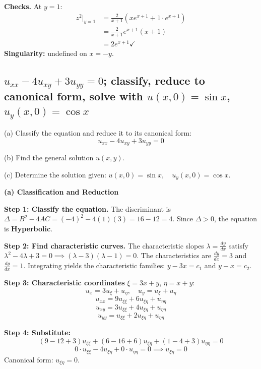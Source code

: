 \documentclass[a4paper,11pt]{article} %
\begin{document}
\textbf{Checks.} At $y=1$:
\begin{align*}
    z^2 \big|_{y=1} &= \frac{2}{x+1} \left( x e^{x+1} + 1 \cdot e^{x + 1} \right) \\
    &= \frac{2}{x+1} e^{x+1} (x+1) \\
    &= 2e^{x+1} \checkmark
\end{align*}
\textbf{Singularity:} undefined on $x=-y$.
\newpage
\subsection{\texorpdfstring{$u_{xx} - 4u_{xy} + 3u_{yy} = 0$; classify, reduce to canonical form, solve with $u(x,0)=\sin x$, $u_y(x,0)=\cos x$}{Classify hyperbolic PDE, find characteristic coords, solve Cauchy problem}}

\begin{problembox}
(a) Classify the equation and reduce it to its canonical form:
$$u_{xx} - 4u_{xy} + 3u_{yy} = 0$$

(b) Find the general solution $u(x,y)$.

(c) Determine the solution given: $u(x, 0) = \sin x, \quad u_y(x, 0) = \cos x$.
\end{problembox}


\textbf{(a) Classification and Reduction}

\textbf{Step 1: Classify the equation.}
The discriminant is $\Delta = B^2 - 4AC = (-4)^2 - 4(1)(3) = 16 - 12 = 4$. Since $\Delta > 0$, the equation is \textbf{Hyperbolic}.

\textbf{Step 2: Find characteristic curves.}
The characteristic slopes $\lambda = \frac{dy}{dx}$ satisfy $\lambda^2 - 4\lambda + 3 = 0 \implies (\lambda-3)(\lambda-1)=0$.
The characteristics are $\frac{dy}{dx} = 3$ and $\frac{dy}{dx} = 1$.
Integrating yields the characteristic families: $y - 3x = c_1$ and $y - x = c_2$.

\textbf{Step 3: Characteristic coordinates} $\xi = 3x+y$, $\eta = x+y$:
$$u_x = 3u_\xi + u_\eta, \quad u_y = u_\xi + u_\eta$$
$$u_{xx} = 9u_{\xi\xi} + 6u_{\xi\eta} + u_{\eta\eta}$$
$$u_{xy} = 3u_{\xi\xi} + 4u_{\xi\eta} + u_{\eta\eta}$$
$$u_{yy} = u_{\xi\xi} + 2u_{\xi\eta} + u_{\eta\eta}$$

\textbf{Step 4: Substitute:}
$$ (9 - 12 + 3)u_{\xi\xi} + (6 - 16 + 6)u_{\xi\eta} + (1 - 4 + 3)u_{\eta\eta} = 0 $$
$$ 0 \cdot u_{\xi\xi} - 4u_{\xi\eta} + 0 \cdot u_{\eta\eta} = 0 \implies u_{\xi\eta} = 0 $$
Canonical form: $u_{\xi\eta} = 0$.
\end{document}
